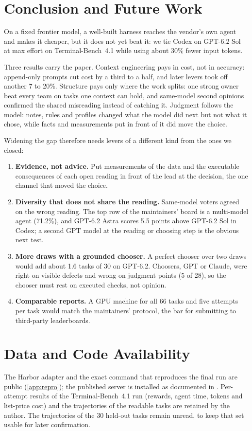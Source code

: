 \section{Conclusion and Future Work}
\label{sec:conclusion}

On a fixed frontier model, a well-built harness reaches the vendor's own agent and makes it
cheaper, but it does not yet beat it: we tie Codex on GPT-6.2 Sol at max effort on
Terminal-Bench~4.1 while using about 30\% fewer input tokens.

Three results carry the paper. Context engineering pays in cost, not in accuracy: append-only
prompts cut cost by a third to a half, and later levers took off another 7 to 20\%. Structure pays
only where the work splits: one strong owner beat every team on tasks one context can hold, and
same-model second opinions confirmed the shared misreading instead of catching it. Judgment follows
the model: notes, rules and profiles changed what the model did next but not what it chose, while
facts and measurements put in front of it did move the choice.

Widening the gap therefore needs levers of a different kind from the ones we closed:
\begin{enumerate}[leftmargin=1.6em]
  \item \textbf{Evidence, not advice.} Put measurements of the data and the executable consequences
    of each open reading in front of the lead at the decision, the one channel that moved the
    choice.
  \item \textbf{Diversity that does not share the reading.} Same-model voters agreed on the wrong
    reading. The top row of the maintainers' board is a multi-model agent (71.2\%), and GPT-6.2
    Astra scores 5.5 points above GPT-6.2 Sol in Codex; a second GPT model at the reading or
    choosing step is the obvious next test.
  \item \textbf{More draws with a grounded chooser.} A perfect chooser over two draws would add
    about 1.6 tasks of 30 on GPT-6.2. Choosers, GPT or Claude, were right on visible defects and
    wrong on judgment points (5 of 28), so the chooser must rest on executed checks, not opinion.
  \item \textbf{Comparable reports.} A GPU machine for all 66 tasks and five attempts per task
    would match the maintainers' protocol, the bar for submitting to third-party leaderboards.
\end{enumerate}

\section*{Data and Code Availability}
The Harbor adapter and the exact command that reproduces the final run are public
\citep{zhang2026adapter} (\cref{app:repro}); the published server is installed as documented in
\citep{zeroth2026server}. Per-attempt results of the Terminal-Bench~4.1 run (rewards, agent time,
tokens and list-price cost) and the trajectories of the readable tasks are retained by the author.
The trajectories of the 30 held-out tasks remain unread, to keep that set usable for later
confirmation.

